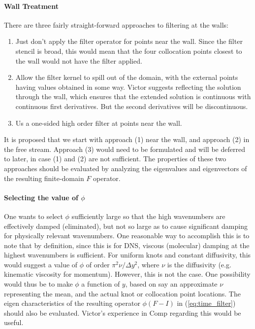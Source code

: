 \documentclass[11pt]{article}%
\begin{document}
\paragraph{Wall Treatment} There are three fairly straight-forward
approaches to filtering at the walls:
\begin{enumerate}
\item Just don't apply the filter operator for points near the
      wall. Since the filter stencil is broad, this would mean that the
      four collocation points closest to the wall would not have the
      filter applied.
\item Allow the filter kernel to spill out of the domain, with the
      external points having values obtained in some way. Victor
      suggests reflecting the solution through the wall, which ensures
      that the extended solution is continuous with continuous first
      derivatives. But the second derivatives will be discontinuous.
\item Us a one-sided high order filter at points near the wall.
\end{enumerate}
It is proposed that we start with approach (1) near the wall, and
approach (2) in the free stream. Approach (3) would need to be
formulated and will be deferred to later, in case (1) and (2)  are not
sufficient. The properties of these two approaches should be evaluated
by analyzing the eigenvalues and eigenvectors of the resulting
finite-domain $F$ operator.

\paragraph{Selecting the value of $\phi$}
One wants to select $\phi$ sufficiently large so that the high
wavenumbers are effectively damped (eliminated), but not so large as to
cause significant damping for physically relevant wavenumbers. One
reasonable way to accomplish this is to note that by definition, since
this is for DNS, viscous (molecular) damping at the highest wavenumbers
is sufficient. For uniform knots and constant diffusivity, this would
suggest a value of $\phi$ of order $\pi^2\nu/\Delta y^2$, where $\nu$ is
the diffusivity (e.g. kinematic viscosity for momentum). However, this
is not the case. One possibility would thus be to make $\phi$ a function
of $y$, based on say an approximate $\nu$ representing the mean, and the
actual knot or collocation point locations. The eigen characteristics of
the resulting operator $\phi(F-I)$ in (\ref{eq:time_filter}) should also
be evaluated. Victor's experience in Comp regarding this would be useful.
\end{document}
